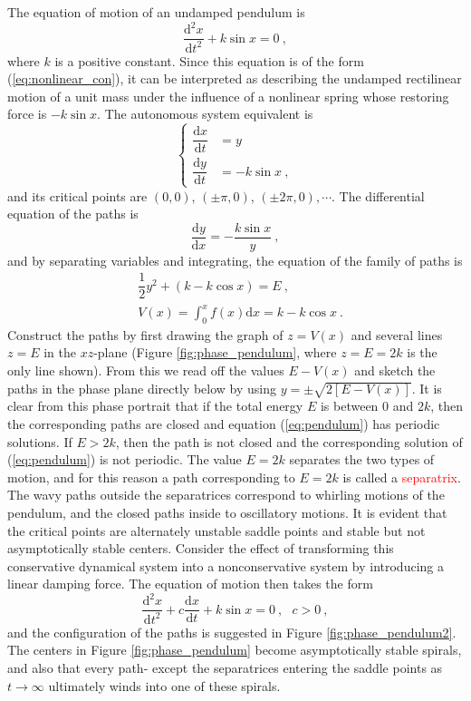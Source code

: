 \documentclass[12pt,a4paper]{article}
\newcommand{\dif}{\mathrm{d}}
\begin{document}
The equation of motion of an undamped pendulum is
\begin{equation}
\dfrac{\dif^2 x}{\dif t^2}  + k \sin x = 0 ~,
\label{eq:pendulum}
\end{equation}
where $k$ is a positive constant. Since this equation is of the form (\ref{eq:nonlinear_con}), it can be interpreted as describing the undamped rectilinear motion of a unit mass under the influence of a nonlinear spring whose restoring force is $-k \sin x$. The autonomous system equivalent is
\begin{equation}
\left\{
\begin{aligned}
\dfrac{\dif x}{\dif t} & =  y \\
\dfrac{\dif y}{\dif t} & =  -k \sin x ~, 
\end{aligned}
\right.
\end{equation}
and its critical points are $(0,0)$, $(\pm \pi,0)$, $(\pm 2\pi,0), \cdots$. The differential equation of the paths is
\begin{equation*}
\dfrac{\dif y}{\dif x}  = -\dfrac{k\sin x}{y} ~,
\end{equation*}
and by separating variables and integrating, the equation of the family of paths is
\begin{align*}
& \dfrac{1}{2}  y^2 + (k-k\cos x) = E ~, \\
& V(x) = \int_0^x f(x) \dif x = k - k\cos x ~.
\end{align*}
Construct the paths by first drawing the graph of $z=V(x)$ and several lines $z=E$ in the $xz$-plane (Figure \ref{fig:phase_pendulum}, where $z = E = 2k$ is the only line shown). From this we read off the values $E - V(x)$ and sketch the paths in the phase plane directly below by using $y = \pm \sqrt{2[E - V(x)]}$. It is clear from this phase portrait that if the total energy $E$ is between $0$ and $2k$, then the corresponding paths are closed and equation (\ref{eq:pendulum}) has periodic solutions. If $E > 2k$, then the path is not closed and the corresponding solution of (\ref{eq:pendulum}) is not periodic. The value $E = 2k$ separates the two types of motion, and for this reason a path corresponding to $E=2k$ is called a \textcolor{red}{separatrix}. The wavy paths outside the separatrices correspond to whirling motions of the pendulum, and the closed paths inside to oscillatory motions. It is evident that the critical points are alternately unstable saddle points and stable but not asymptotically stable centers. Consider the effect of transforming this conservative dynamical system into a nonconservative system by introducing a linear damping force. The equation of motion then takes the form
\begin{equation}
\dfrac{\dif^2 x}{\dif t^2}  +c\dfrac{\dif x}{\dif t}  + k \sin x = 0 ~, ~~~ c > 0 ~,
\end{equation}
and the configuration of the paths is suggested in Figure \ref{fig:phase_pendulum2}. The centers in Figure \ref{fig:phase_pendulum} become asymptotically stable spirals, and also that every path- except the separatrices entering the saddle points as $t \rightarrow \infty$ ultimately winds into one of these spirals.
\end{document}
